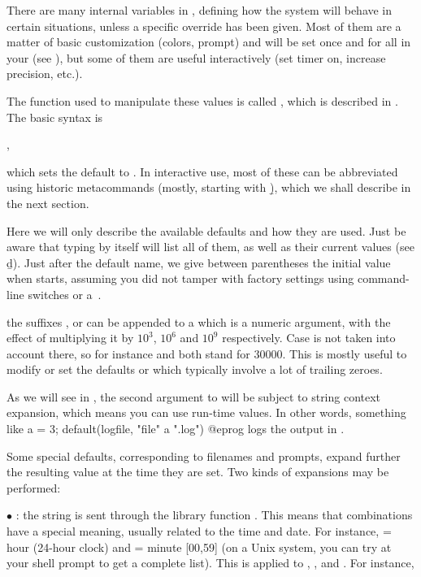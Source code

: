 \noindent There are many internal variables in , defining how the
system will behave in certain situations, unless a specific override has been
given. Most of them are a matter of basic customization (colors, prompt) and
will be set once and for all in your  (see
), but some of them are useful interactively (set timer on,
increase precision, etc.).

The function used to manipulate these values is called , which
is described in . The basic syntax is

,

\noindent which sets the default  to . In interactive
use, most of these can be abbreviated using historic  metacommands
(mostly, starting with \b), which we shall describe in the next section.

Here we will only describe the available defaults and how they are used. Just
be aware that typing  by itself will list all of them, as well
as their current values (see \b{d}). Just after the default name, we give
between parentheses the initial value when  starts, assuming you did
not tamper with factory settings using command-line switches or a~.

 the suffixes ,  or  can be appended to
a  which is a numeric argument, with the effect of multiplying it
by $10^3$, $10^6$ and $10^9$ respectively. Case is not taken into account
there, so for instance  and  both stand for $30000$. This
is mostly useful to modify or set the defaults  or
 which typically involve a lot of trailing zeroes.

 As we will see in ,
the second argument to  will be subject to string context
expansion, which means you can use run-time values. In other words, something
like
\bprog
  a = 3;
  default(logfile, "file" a ".log")
@eprog
logs the output in .

Some special defaults, corresponding to filenames and prompts, expand further
the resulting value at the time they are set. Two kinds of expansions may be
performed:

$\bullet$ : the string is sent through the library
function . This means that \kbd{\%} combinations have
a special meaning, usually related to the time and date. For instance,
 = hour (24-hour clock) and  = minute [00,59] (on a Unix
system, you can try  at your shell prompt to get a complete
list). This is applied to , , and . For
instance,

